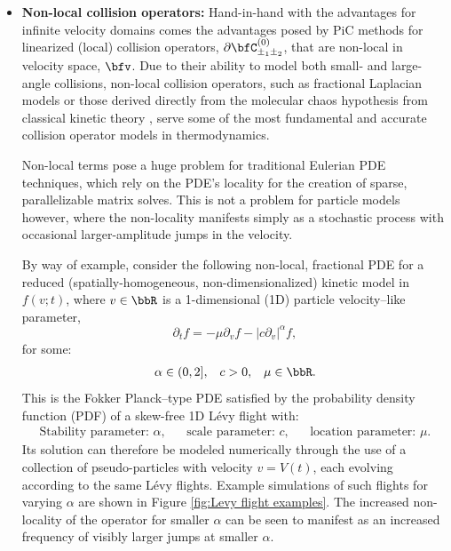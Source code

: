 \begin{itemize}
        \item  {\bf Non-local collision operators:} Hand-in-hand with the advantages for infinite velocity domains comes the advantages posed by PiC methods for linearized (local) collision operators, $\partial\bfC_{\pm_{1}\pm_{2}}^{(0)}$, that are non-local in velocity space, $\bfv$. Due to their ability to model both small- and large-angle collisions, non-local collision operators, such as fractional Laplacian models \cite{Cho_2015, Sakomoto_2016, Kiselev_Schmalian_2019} or those derived directly from the molecular chaos hypothesis from classical kinetic theory \cite{Lerner_Trigg_1991}, serve some of the most fundamental and accurate collision operator models in thermodynamics. 
        
        Non-local terms pose a huge problem for traditional Eulerian PDE techniques, which rely on the PDE's locality for the creation of sparse, parallelizable matrix solves. This is not a problem for particle models however, where the non-locality manifests simply as a stochastic process with occasional larger-amplitude jumps in the velocity.

        By way of example, consider the following non-local, fractional PDE for a reduced (spatially-homogeneous, non-dimensionalized) kinetic model in $f(v; t)$, where $v  \in  \bbR$ is a 1-dimensional (1D) particle velocity--like parameter,
        \begin{equation}\label{eqn:reduced Boltzmann equation}
            \partial_{t}f  =  - \mu\partial_{v}f - |c\partial_{v}|^{\alpha}f,
        \end{equation}
        for some:
        \begin{align*}
            \alpha  \in  (0, 2],  &&
            c       >    0,       &&
            \mu     \in  \bbR.
        \end{align*}
        This is the Fokker Planck--type PDE satisfied by the probability density function (PDF) of a skew-free 1D Lévy flight \cite{Chechkin_et_al_2008} with:
        \begin{align*}
            \text{Stability parameter: } \alpha,  &&
            \text{scale parameter: } c,           &&
            \text{location parameter: } \mu.
        \end{align*}
        Its solution can therefore be modeled numerically through the use of a collection of pseudo-particles with velocity $v  =  V(t)$, each evolving according to the same Lévy flights. Example simulations of such flights for varying $\alpha$ are shown in Figure \ref{fig:Levy flight examples}. The increased non-locality of the operator for smaller $\alpha$ can be seen to manifest as an increased frequency of visibly larger jumps at smaller $\alpha$.


\end{itemize}
